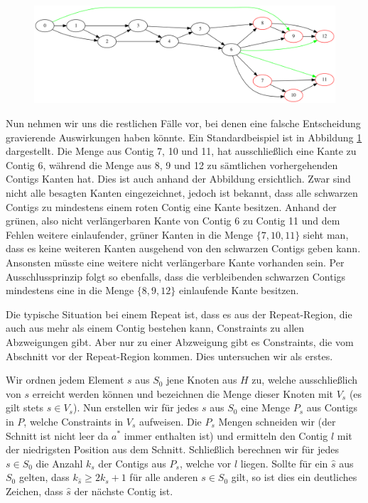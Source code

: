 \begin{figure}
	\begin{center}
		\includegraphics[width=1\textwidth]{bilder/bigsplit}
	\end{center}
	\label{bigsplit}
	\caption{}
\end{figure}
Nun nehmen wir uns die restlichen Fälle vor, bei denen eine falsche Entscheidung gravierende Auswirkungen haben könnte. Ein Standardbeispiel ist in Abbildung \ref{bigsplit} dargestellt. 
Die Menge aus Contig 7, 10 und 11, hat ausschließlich eine Kante zu Contig 6, während die Menge aus 8, 9 und 12 zu sämtlichen vorhergehenden Contigs Kanten hat.
Dies ist auch anhand der Abbildung ersichtlich. Zwar sind nicht alle besagten Kanten eingezeichnet, jedoch ist bekannt, dass alle schwarzen Contigs zu mindestens einem roten Contig eine Kante besitzen. Anhand der grünen, also nicht verlängerbaren Kante von Contig 6 zu Contig 11 und dem Fehlen weitere einlaufender, grüner Kanten in die Menge $\{ 7, 10, 11 \}$ sieht man, dass es keine weiteren Kanten ausgehend von den schwarzen Contigs geben kann. Ansonsten müsste eine weitere nicht verlängerbare Kante vorhanden sein.
Per Ausschlussprinzip folgt so ebenfalls, dass die verbleibenden schwarzen Contigs mindestens eine in die Menge $\{8,9,12\}$ einlaufende Kante besitzen.

Die typische Situation bei einem Repeat ist, dass es aus der Repeat-Region, die auch aus mehr als einem Contig bestehen kann, Constraints zu allen Abzweigungen gibt. Aber nur zu einer Abzweigung gibt es Constraints, die vom Abschnitt vor der Repeat-Region kommen. Dies untersuchen wir als erstes.

Wir ordnen jedem Element $s$ aus $S_0$ jene Knoten aus $H$ zu, welche ausschließlich von $s$ erreicht werden können und bezeichnen die Menge dieser Knoten mit $V_s$ (es gilt stets $s \in V_s$). Nun erstellen wir für jedes $s$ aus $S_0$ eine Menge $P_s$ aus Contigs in $P$, welche Constraints in $V_s$ aufweisen. Die $P_s$ Mengen schneiden wir (der Schnitt ist nicht leer da $a^*$ immer enthalten ist) und ermitteln den Contig $l$ mit der niedrigsten Position aus dem Schnitt. Schließlich berechnen wir für jedes $s \in S_0$ die Anzahl $k_s$ der Contigs aus $P_s$, welche vor $l$ liegen. Sollte für ein $\hat{s}$ aus $S_0$ gelten, dass $k_{\hat{s}} \geq 2k_s+1$ für alle anderen $s \in S_0$ gilt, so ist dies ein deutliches Zeichen, dass  $\hat{s}$ der nächste Contig ist. 


